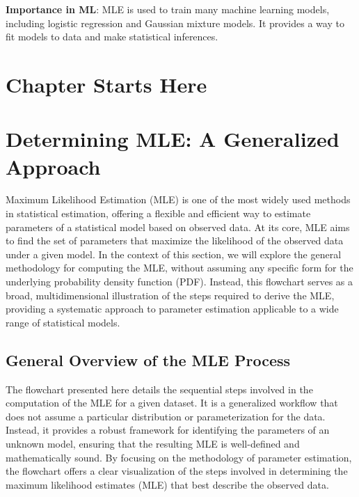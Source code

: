 \documentclass[
  12 pt,
  a4paper,
]{book}
\numberwithin{equation}{section}
\theoremstyle{plain}      %
\theoremstyle{definition} %
\theoremstyle{remark}     %
\theoremstyle{note}         %
\begin{document}
\textbf{Importance in ML}: MLE is used to train many machine learning
models, including logistic regression and Gaussian mixture models. It
provides a way to fit models to data and make statistical inferences.

\vspace*{\fill}

\newpage

\hypertarget{chapter-starts-here}{%
\section{Chapter Starts Here}\label{chapter-starts-here}}

\newpage

\hypertarget{determining-mle-a-generalized-approach}{%
\section{Determining MLE: A Generalized
Approach}\label{determining-mle-a-generalized-approach}}

Maximum Likelihood Estimation (MLE) is one of the most widely used
methods in statistical estimation, offering a flexible and efficient way
to estimate parameters of a statistical model based on observed data. At
its core, MLE aims to find the set of parameters that maximize the
likelihood of the observed data under a given model. In the context of
this section, we will explore the general methodology for computing the
MLE, without assuming any specific form for the underlying probability
density function (PDF). Instead, this flowchart serves as a broad,
multidimensional illustration of the steps required to derive the MLE,
providing a systematic approach to parameter estimation applicable to a
wide range of statistical models.

\hypertarget{general-overview-of-the-mle-process}{%
\subsection{General Overview of the MLE
Process}\label{general-overview-of-the-mle-process}}

The flowchart presented here details the sequential steps involved in
the computation of the MLE for a given dataset. It is a generalized
workflow that does not assume a particular distribution or
parameterization for the data. Instead, it provides a robust framework
for identifying the parameters of an unknown model, ensuring that the
resulting MLE is well-defined and mathematically sound. By focusing on
the methodology of parameter estimation, the flowchart offers a clear
visualization of the steps involved in determining the maximum
likelihood estimates (MLE) that best describe the observed data.
\end{document}
